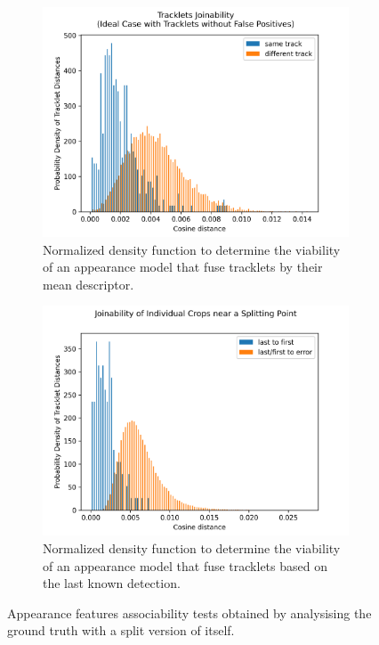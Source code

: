 \begin{figure}[!hp]
	\centering
	\begin{subfigure}[]{0.49\textwidth}
		\includegraphics[width=\textwidth]{figures/06_results/atr/03_tracklet_dist_hist.png}
		\caption{\footnotesize{Normalized density function to determine the viability of an appearance model that fuse tracklets by their mean descriptor.}}
		\label{fig:appearance_joinability_all}
	\end{subfigure}
	\begin{subfigure}[]{0.49\textwidth}
		\includegraphics[width=\textwidth]{figures/06_results/atr/05_split_dist_hist.png}
		\caption{\footnotesize{Normalized density function to determine the viability of an appearance model that fuse tracklets based on the last known detection.}}
		\label{fig:appearance_joinability_scope}
	\end{subfigure}
	\caption[Appearance features associability]{\footnotesize{Appearance features associability tests obtained by analysising the ground truth with a split version of itself.}}
	\label{fig:appearance_joinability}
\end{figure}


